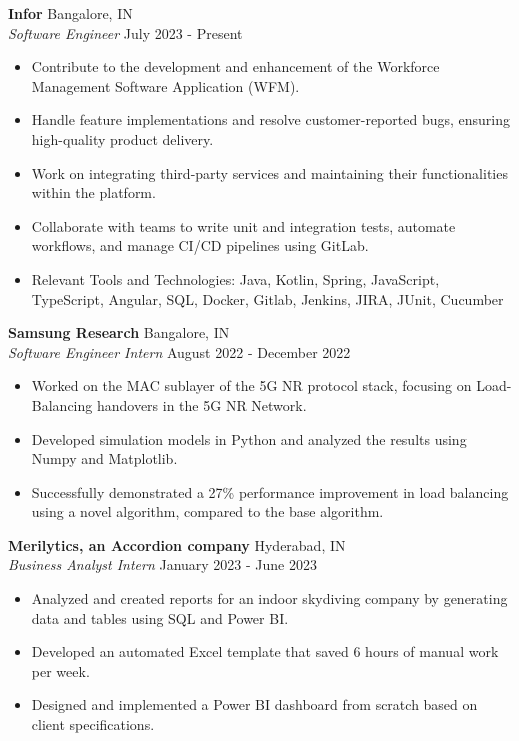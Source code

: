 \documentclass[a4paper]{article}
\begin{document}
\textbf{Infor} \hfill Bangalore, IN\\
\textit{Software Engineer} \hfill July 2023 - Present\\
\vspace{-1mm}
\begin{itemize} \itemsep 1pt
	\item Contribute to the development and enhancement of the Workforce Management Software Application (WFM).
	\item Handle feature implementations and resolve customer-reported bugs, ensuring high-quality product delivery.
	\item Work on integrating third-party services and maintaining their functionalities within the platform.
	\item Collaborate with teams to write unit and integration tests, automate workflows, and manage CI/CD pipelines using GitLab.
	\item Relevant Tools and Technologies: Java, Kotlin, Spring, JavaScript, TypeScript, Angular, SQL, Docker, Gitlab, Jenkins, JIRA, JUnit, Cucumber
\end{itemize}
\textbf{Samsung Research} \hfill Bangalore, IN\\
\textit{Software Engineer Intern} \hfill August 2022 - December 2022\\
\vspace{-1mm}
\begin{itemize} \itemsep 1pt
	\item Worked on the MAC sublayer of the 5G NR protocol stack, focusing on Load-Balancing handovers in the 5G NR Network.
	\item Developed simulation models in Python and analyzed the results using Numpy and Matplotlib.
	\item Successfully demonstrated a 27\% performance improvement in load balancing using a novel algorithm, compared to the base algorithm.
\end{itemize}
\textbf{Merilytics, an Accordion company} \hfill Hyderabad, IN\\
\textit{Business Analyst Intern} \hfill January 2023 - June 2023\\
\vspace{-1mm}
\begin{itemize} \itemsep 1pt
	\item Analyzed and created reports for an indoor skydiving company by generating data and tables using SQL and Power BI.
	\item Developed an automated Excel template that saved 6 hours of manual work per week.
	\item Designed and implemented a Power BI dashboard from scratch based on client specifications.
\end{itemize}
\end{document}
